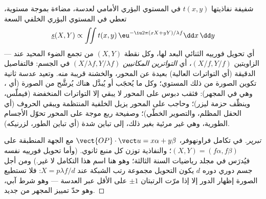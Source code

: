 \begin{proposition}\label{prop:b2:diffraction:fourier}
شفيفة نفاذيتها $t(x, y)$ في المستوي البؤري الأمامي
لعدسة، مضاءة بموجة مستوية، تعطي في المستوي البؤري الخلفي
السعة
\[
\underline s(X, Y) \propto \iint t(x, y)\,\eu^{-\iu2\pi(xX + yY)/\lambda f}\dd x\,\dd y
\]
--- أي تحويل فورييه الثنائي البعد لها، وكل نقطة $(X, Y)$ من
\emph{} تجمع الضوء المحيد عند الزاويتين
$(X/f, Y/f)$، أي \emph{التواترين المكانيين} $(X/\lambda f, Y/\lambda f)$ في
الجسم: فالتفاصيل الدقيقة (أي التواترات العالية) بعيدة عن المحور، والخشنة
قريبة منه. وتعيد عدسة ثانية تكوين الصورة من ذلك المستوي؛ وكل ما
يُحجَب أو يُبدَّل هناك يُرشَّح من الصورة
(أي \emph{}، وهي  في المجهر): فثقب دبوس
على المحور لا يبقي إلا التواترات المنخفضة (فيملّس، وينظّف
حزمة ليزر)؛ وحاجب على المحور يزيل الخلفية المنتظمة ويبقي
الحروف (أي الحقل المظلم، والتصوير الخطّي)؛ وصفيحة ربع موجة على
المحور تحوّل الأجسام الطورية، وهي غير مرئية بغير ذلك، إلى تباين شدة
(أي تباين الطور، لزرنيكه).
\end{proposition}

\begin{proof}[تبرير]
في تكامل فراونهوفر، $\vect{OP}\cdot\vect u = x\alpha + y\beta$ مع
الجهة المنطبقة على $(X, Y) = (f\alpha, f\beta)$؛ والنفاذية توزن
كل منبع ثانوي. (وأما تحويل فورييه نفسه فيُدرَس في
مجلد رياضيات السنة الثالثة؛ وهو هنا اسم هذا التكامل لا غير.)
ومن أجل جسم دوري دوره $d$ يكون التحويل مجموعة رتب
الشبكة عند $X = p\lambda f/d$: فلا تستطيع الصورة إظهار الدور إلا إذا مرّت
الرتبتان $\pm1$ على الأقل عبر العدسة --- وهو شرط آبي، وهو
حدّ تمييز المجهر من جديد.
\end{proof}

